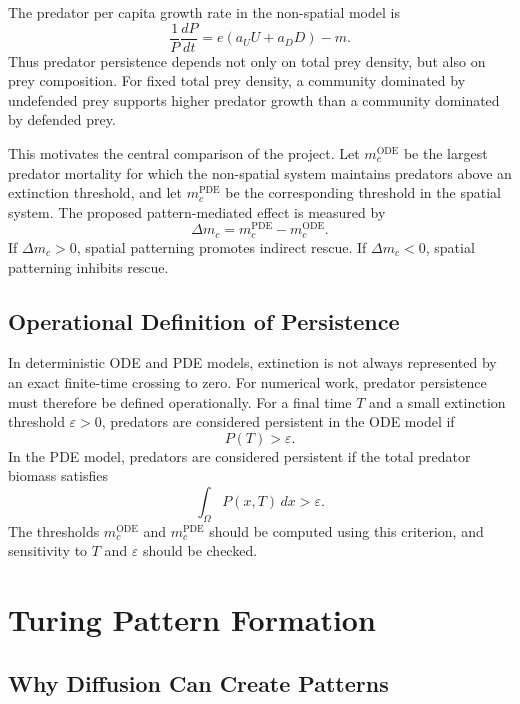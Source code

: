 \documentclass[12pt,letterpaper]{article}
\numberwithin{equation}{section}
\begin{document}
The predator per capita growth rate in the non-spatial model is
\begin{equation}
    \frac{1}{P}\frac{dP}{dt}
    =
    e(a_U U+a_D D)-m.
\end{equation}
Thus predator persistence depends not only on total prey density, but also on prey
composition. For fixed total prey density, a community dominated by undefended prey
supports higher predator growth than a community dominated by defended prey.

This motivates the central comparison of the project. Let $m_c^{\mathrm{ODE}}$ be the
largest predator mortality for which the non-spatial system maintains predators above
an extinction threshold, and let $m_c^{\mathrm{PDE}}$ be the corresponding threshold in
the spatial system. The proposed pattern-mediated effect is measured by
\begin{equation}
    \Delta m_c=m_c^{\mathrm{PDE}}-m_c^{\mathrm{ODE}}.
\end{equation}
If $\Delta m_c>0$, spatial patterning promotes indirect rescue. If
$\Delta m_c<0$, spatial patterning inhibits rescue.

\subsection{Operational Definition of Persistence}

In deterministic ODE and PDE models, extinction is not always represented by an exact
finite-time crossing to zero. For numerical work, predator persistence must therefore
be defined operationally. For a final time $T$ and a small extinction threshold
$\varepsilon>0$, predators are considered persistent in the ODE model if
\begin{equation}
    P(T)>\varepsilon.
\end{equation}
In the PDE model, predators are considered persistent if the total predator biomass
satisfies
\begin{equation}
    \int_{\Omega}P(x,T)\,dx>\varepsilon.
\end{equation}
The thresholds $m_c^{\mathrm{ODE}}$ and $m_c^{\mathrm{PDE}}$ should be computed using
this criterion, and sensitivity to $T$ and $\varepsilon$ should be checked.

\section{Turing Pattern Formation}

\subsection{Why Diffusion Can Create Patterns}
\end{document}
